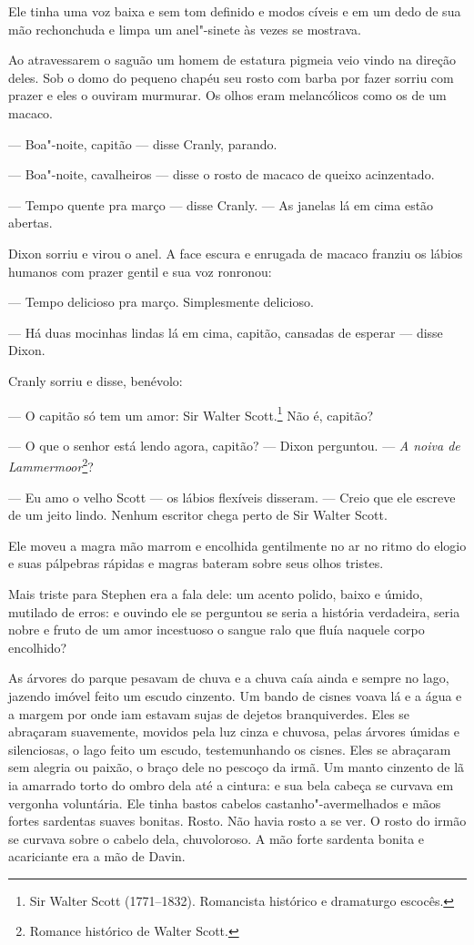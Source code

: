 Ele tinha uma voz baixa e sem tom definido e modos cíveis e em um dedo
de sua mão rechonchuda e limpa um anel"-sinete às vezes se mostrava.

Ao atravessarem o saguão um homem de estatura pigmeia veio vindo na
direção deles. Sob o domo do pequeno chapéu seu rosto com barba por
fazer sorriu com prazer e eles o ouviram murmurar. Os olhos eram
melancólicos como os de um macaco.

 --- Boa"-noite, capitão --- disse Cranly, parando.

 --- Boa"-noite, cavalheiros --- disse o rosto de macaco de queixo acinzentado.

 --- Tempo quente pra março --- disse Cranly. --- As janelas lá em cima estão
abertas.

Dixon sorriu e virou o anel. A face escura e enrugada de macaco franziu
os lábios humanos com prazer gentil e sua voz ronronou:

 --- Tempo delicioso pra março. Simplesmente delicioso.

 --- Há duas mocinhas lindas lá em cima, capitão, cansadas de esperar --- disse Dixon.

 Cranly sorriu e disse, benévolo:

 --- O capitão só tem um amor: Sir Walter Scott.\footnote{ Sir Walter Scott (1771--1832). Romancista histórico e dramaturgo escocês.}  Não é, capitão? 

 --- O que o senhor está lendo agora, capitão? --- Dixon perguntou. --- \textit{A
noiva de Lammermoor}\footnote{ Romance histórico de Walter Scott.}?                                                    

 --- Eu amo o velho Scott --- os lábios flexíveis disseram. --- Creio que ele
 escreve de um jeito lindo. Nenhum escritor chega perto de Sir Walter Scott.

Ele moveu a magra mão marrom e encolhida gentilmente no ar no ritmo do
elogio e suas pálpebras rápidas e magras bateram sobre seus olhos
tristes.

Mais triste para Stephen era a fala dele: um acento polido, baixo e
úmido, mutilado de erros: e ouvindo ele se perguntou se seria a
história verdadeira, seria nobre e fruto de um amor incestuoso o sangue 
ralo que fluía naquele corpo encolhido?

As árvores do parque pesavam de chuva e a chuva caía ainda e sempre no
lago, jazendo imóvel feito um escudo cinzento. Um bando de cisnes voava lá e a
água e a margem por onde iam estavam sujas de dejetos branquiverdes. 
Eles se abraçaram suavemente, movidos pela luz cinza e chuvosa, pelas
árvores úmidas e silenciosas, o lago feito um escudo, testemunhando os cisnes. 
Eles se abraçaram sem alegria ou paixão, o braço dele no
pescoço da irmã. Um manto cinzento de lã ia amarrado torto do ombro
dela até a cintura: e sua bela cabeça se curvava em vergonha
voluntária. Ele tinha bastos cabelos castanho"-avermelhados e mãos
fortes sardentas suaves bonitas. Rosto. Não havia rosto a se ver. O
rosto do irmão se curvava sobre o cabelo dela, chuvoloroso. A mão forte 
sardenta bonita e acariciante era a mão de Davin.

